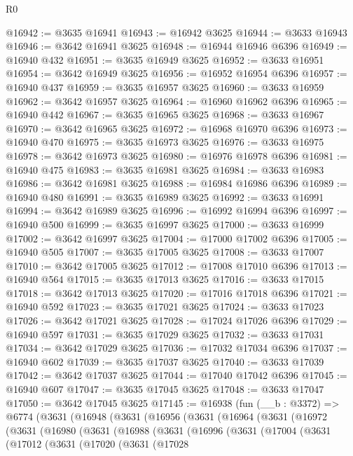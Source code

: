 \begin{lexlean}{R0}
\begin{coremodule}
@16942 := @3635 @16941
@16943 := @16942 @3625
@16944 := @3633 @16943
@16946 := @3642 @16941 @3625
@16948 := @16944 @16946 @6396
@16949 := @16940 @432
@16951 := @3635 @16949 @3625
@16952 := @3633 @16951
@16954 := @3642 @16949 @3625
@16956 := @16952 @16954 @6396
@16957 := @16940 @437
@16959 := @3635 @16957 @3625
@16960 := @3633 @16959
@16962 := @3642 @16957 @3625
@16964 := @16960 @16962 @6396
@16965 := @16940 @442
@16967 := @3635 @16965 @3625
@16968 := @3633 @16967
@16970 := @3642 @16965 @3625
@16972 := @16968 @16970 @6396
@16973 := @16940 @470
@16975 := @3635 @16973 @3625
@16976 := @3633 @16975
@16978 := @3642 @16973 @3625
@16980 := @16976 @16978 @6396
@16981 := @16940 @475
@16983 := @3635 @16981 @3625
@16984 := @3633 @16983
@16986 := @3642 @16981 @3625
@16988 := @16984 @16986 @6396
@16989 := @16940 @480
@16991 := @3635 @16989 @3625
@16992 := @3633 @16991
@16994 := @3642 @16989 @3625
@16996 := @16992 @16994 @6396
@16997 := @16940 @500
@16999 := @3635 @16997 @3625
@17000 := @3633 @16999
@17002 := @3642 @16997 @3625
@17004 := @17000 @17002 @6396
@17005 := @16940 @505
@17007 := @3635 @17005 @3625
@17008 := @3633 @17007
@17010 := @3642 @17005 @3625
@17012 := @17008 @17010 @6396
@17013 := @16940 @564
@17015 := @3635 @17013 @3625
@17016 := @3633 @17015
@17018 := @3642 @17013 @3625
@17020 := @17016 @17018 @6396
@17021 := @16940 @592
@17023 := @3635 @17021 @3625
@17024 := @3633 @17023
@17026 := @3642 @17021 @3625
@17028 := @17024 @17026 @6396
@17029 := @16940 @597
@17031 := @3635 @17029 @3625
@17032 := @3633 @17031
@17034 := @3642 @17029 @3625
@17036 := @17032 @17034 @6396
@17037 := @16940 @602
@17039 := @3635 @17037 @3625
@17040 := @3633 @17039
@17042 := @3642 @17037 @3625
@17044 := @17040 @17042 @6396
@17045 := @16940 @607
@17047 := @3635 @17045 @3625
@17048 := @3633 @17047
@17050 := @3642 @17045 @3625
@17145 := @16938
    (fun (__b : @3372) =>
    @6774
      (@3631
        (@16948
          (@3631
            (@16956
              (@3631
                (@16964
                  (@3631
                    (@16972
                      (@3631
                        (@16980
                          (@3631
                            (@16988
                              (@3631
                                (@16996
                                  (@3631
                                    (@17004
                                      (@3631
                                        (@17012
                                          (@3631
                                            (@17020
                                              (@3631
                                                (@17028

\end{coremodule}
\end{lexlean}
